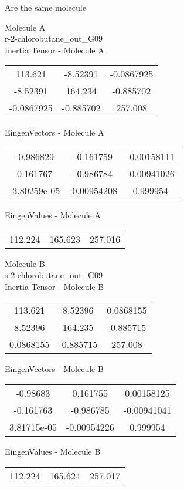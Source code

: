\begin{center}
\vtab
\vtab
\textcolor{NavyBlue}{\Large Are the same molecule}
\end{center}
\newpage
\begin{multicols}{2}
\begin{center}
Molecule A \\ 
r-2-chlorobutane\_out\_G09
\\
Inertia Tensor - Molecule A \\
\vtab
\begin{tabular}{|c c c|}
113.621	 & 	-8.52391	 & 	-0.0867925	 \\
-8.52391	 & 	164.234	 & 	-0.885702	 \\
-0.0867925	 & 	-0.885702	 & 	257.008
\end{tabular}

\vtab
 EingenVectors - Molecule A     \\
\vtab
\begin{tabular}{|c c c|}
-0.986829	 & 	-0.161759	 & 	-0.00158111	 \\
0.161767	 & 	-0.986784	 & 	-0.00941026	 \\
-3.80259e-05	 & 	-0.00954208	 & 	0.999954
\end{tabular}

\vtab
 EingenValues - Molecule A     \\
\vtab
\begin{tabular}{|c c c|}
112.224	 & 	165.623	 & 	257.016
\end{tabular}
\columnbreak

Molecule B \\ 
s-2-chlorobutane\_out\_G09
\\
Inertia Tensor - Molecule B \\
\vtab
\begin{tabular}{|c c c|}
113.621	 & 	8.52396	 & 	0.0868155	 \\
8.52396	 & 	164.235	 & 	-0.885715	 \\
0.0868155	 & 	-0.885715	 & 	257.008
\end{tabular}

\vtab
 EingenVectors - Molecule B     \\
\vtab
\begin{tabular}{|c c c|}
-0.98683	 & 	0.161755	 & 	0.00158125	 \\
-0.161763	 & 	-0.986785	 & 	-0.00941041	 \\
3.81715e-05	 & 	-0.00954226	 & 	0.999954
\end{tabular}

\vtab
 EingenValues - Molecule B     \\
\vtab
\begin{tabular}{|c c c|}
112.224	 & 	165.624	 & 	257.017
\end{tabular}

\end{center}
\end{multicols}

